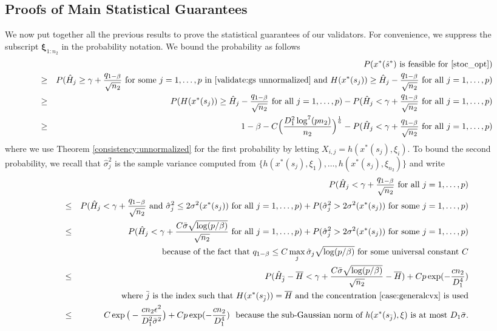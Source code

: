 \documentclass[mnsc,blindrev]{informs4} %
\begin{document}
\subsection{Proofs of Main Statistical Guarantees}\label{main proof: gaussian supremum validators}
We now put together all the previous results to prove the statistical guarantees of our validators. For convenience, we suppress the subscript $\bm{\xi}_{1:n_2}$ in the probability notation.
We bound the probability as follows
\begin{eqnarray}
\notag&&P(x^*(\hat s^*)\text{ is feasible for \eqref{stoc_opt}})\\
\notag&\geq& P(\hat H_j\geq \gamma + \frac{ q_{1-\beta}}{\sqrt{n_2}}\text{ for some }j=1,\ldots,p\text{ in \eqref{validate:gs unnormalized} and }H(x^*(s_j))\geq\hat H_j-  \frac{ q_{1-\beta}}{\sqrt{n_2}}\text{ for all } j=1,\ldots,p)\\
\notag&\geq&P(H(x^*(s_j))\geq\hat H_j-  \frac{ q_{1-\beta}}{\sqrt{n_2}}\text{ for all } j=1,\ldots,p)-P(\hat H_j< \gamma + \frac{ q_{1-\beta}}{\sqrt{n_2}}\text{ for all }j=1,\ldots,p)\\
&\geq&1-\beta-C\Big(\frac{D_1^2\log^7(pn_2)}{n_2}\Big)^{\frac{1}{6}}-P(\hat H_j< \gamma + \frac{ q_{1-\beta}}{\sqrt{n_2}}\text{ for all }j=1,\ldots,p)\label{bound1 for feasibility}
\end{eqnarray}
where we use Theorem \ref{consistency:unnormalized} for the first probability by letting $X_{i,j}=h(x^*(s_j),\xi_i)$. To bound the second probability, we recall that $\hat\sigma_j^2$ is the sample variance computed from $\{h(x^*(s_j),\xi_1),\ldots,h(x^*(s_j),\xi_{n_2})\}$ and write
\begin{eqnarray*}
&&P(\hat H_j< \gamma + \frac{ q_{1-\beta}}{\sqrt{n_2}}\text{ for all }j=1,\ldots,p)\\
&\leq &P(\hat H_j< \gamma + \frac{ q_{1-\beta}}{\sqrt{n_2}}\text{ and }\hat{\sigma}^2_j\leq 2\sigma^2(x^*(s_j))\text{ for all }j=1,\ldots,p)+P(\hat{\sigma}^2_j> 2\sigma^2(x^*(s_j))\text{ for some }j=1,\ldots,p)\\
&\leq &P(\hat H_j< \gamma + \frac{C\bar{\sigma}\sqrt{\log(p/\beta)}}{\sqrt{n_2}}\text{ for all }j=1,\ldots,p)+P(\hat{\sigma}^2_j> 2\sigma^2(x^*(s_j))\text{ for some }j=1,\ldots,p)\\
&&\text{\ \ because of the fact that $q_{1-\beta}\leq C\max_{j}\hat{\sigma}_j\sqrt{\log(p/\beta)}$ for some universal constant $C$}\\
&\leq &P(\hat H_{\bar{j}}-\overline{H}< \gamma + \frac{C\bar{\sigma}\sqrt{\log(p/\beta)}}{\sqrt{n_2}}-\overline{H})+Cp\exp(-\frac{cn_2}{D_1^4})\\
&&\text{\ \ where $\bar{j}$ is the index such that $H(x^*(s_{\bar{j}}))=\overline{H}$ and the concentration \eqref{case:generalcvx} is used}\\
&\leq&C\exp\big(-\frac{cn_2\epsilon^2}{D_1^2\bar{\sigma}^2}\big)+Cp\exp(-\frac{cn_2}{D_1^4})\text{\ \ because the sub-Gaussian norm of }h(x^*(s_{\bar{j}}),\xi)\text{ is at most }D_1\bar{\sigma}.
\end{eqnarray*}
\end{document}
